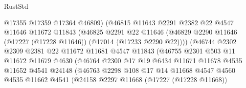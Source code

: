 \begin{lexlean}{RustStd}
\begin{coremodule}
                              @17355
                              @17359
                              @17364
                              @46809)
                            (@46815
                              @11643
                              @2291
                              @2382
                              @22
                              @4547
                              @11646
                              @11672
                              @11843
                              (@46825
                                @2291
                                @22
                                @11646
                                (@46829
                                  @2290
                                  @11646
                                  (@17227 (@17228 @11646))
                                  (@17014 (@17233 @2290 @22))))
                              (@46744
                                @2302
                                @2309
                                @2381
                                @22
                                @11672
                                @11681
                                @4547
                                @11843
                                (@46755
                                  @2301
                                  @503
                                  @11
                                  @11672
                                  @11679
                                  @4630
                                  (@46764
                                    @2300
                                    @17
                                    @19
                                    @6434
                                    @11671
                                    @11678
                                    @4535
                                    @11652
                                    @4541
                                    @24148
                                    (@46763
                                      @2298
                                      @108
                                      @17
                                      @14
                                      @11668
                                      @4547
                                      @4560
                                      @4535
                                      @11662
                                      @4541
                                      (@24158
                                        @2297
                                        @11668
                                        (@17227 (@17228 @11668))

\end{coremodule}
\end{lexlean}
